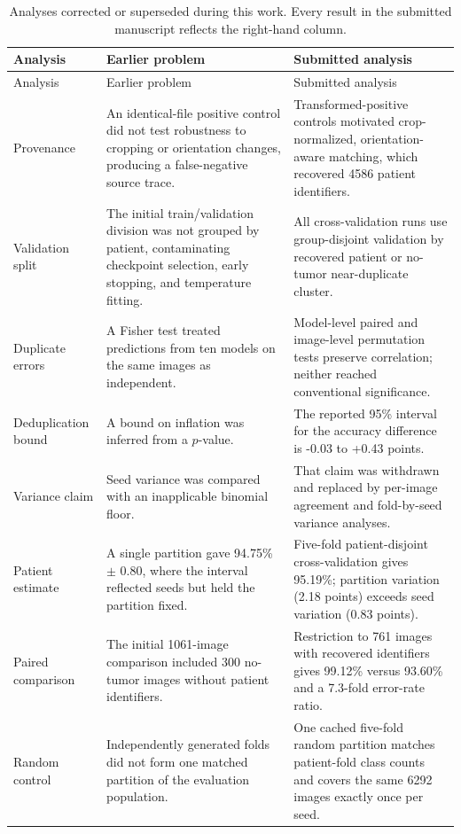 ﻿\documentclass[11pt]{article}
\begin{document}
\begin{longtable}{p{}p{}p{}}
\caption{Analyses corrected or superseded during this work. Every result in the submitted manuscript reflects the right-hand column.}
\label{tab:s_corrections}\\
\toprule
Analysis & Earlier problem & Submitted analysis \\
\midrule
\endfirsthead
\toprule
Analysis & Earlier problem & Submitted analysis \\
\midrule
\endhead
Provenance & An identical-file positive control did not test robustness to cropping or orientation changes, producing a false-negative source trace. & Transformed-positive controls motivated crop-normalized, orientation-aware matching, which recovered 4586 patient identifiers. \\
\addlinespace
Validation split & The initial train/validation division was not grouped by patient, contaminating checkpoint selection, early stopping, and temperature fitting. & All cross-validation runs use group-disjoint validation by recovered patient or no-tumor near-duplicate cluster. \\
\addlinespace
Duplicate errors & A Fisher test treated predictions from ten models on the same images as independent. & Model-level paired and image-level permutation tests preserve correlation; neither reached conventional significance. \\
\addlinespace
Deduplication bound & A bound on inflation was inferred from a $p$-value. & The reported 95\% interval for the accuracy difference is -0.03 to +0.43 points. \\
\addlinespace
Variance claim & Seed variance was compared with an inapplicable binomial floor. & That claim was withdrawn and replaced by per-image agreement and fold-by-seed variance analyses. \\
\addlinespace
Patient estimate & A single partition gave 94.75\% $\pm$ 0.80, where the interval reflected seeds but held the partition fixed. & Five-fold patient-disjoint cross-validation gives 95.19\%; partition variation (2.18 points) exceeds seed variation (0.83 points). \\
\addlinespace
Paired comparison & The initial 1061-image comparison included 300 no-tumor images without patient identifiers. & Restriction to 761 images with recovered identifiers gives 99.12\% versus 93.60\% and a 7.3-fold error-rate ratio. \\
\addlinespace
Random control & Independently generated folds did not form one matched partition of the evaluation population. & One cached five-fold random partition matches patient-fold class counts and covers the same 6292 images exactly once per seed. \\
\bottomrule
\end{longtable}
\end{document}

